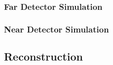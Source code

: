 \subsubsection{Far Detector Simulation}
\label{sec:detectors-sc-physics-software-simulation-fd}


\subsubsection{Near Detector Simulation}
\label{sec:detectors-sc-physics-software-simulation-nd}
 


\subsection{Reconstruction}
\label{sec:detectors-sc-physics-software-reco}



